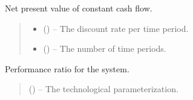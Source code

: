 \documentclass[letterpaper,10pt,english]{sphinxmanual}
\begin{document}
\begin{fulllineitems}
\label{\detokenize{technology:technology.pv_residential_large.npv}}
\pysigstartsignatures
{}
\pysigstopsignatures
\sphinxAtStartPar
Net present value of constant cash flow.
\begin{quote}\begin{description}
\begin{itemize}
\item {} 
\sphinxAtStartPar
{} () – The discount rate per time period.

\item {} 
\sphinxAtStartPar
{} () – The number of time periods.

\end{itemize}

\end{description}\end{quote}

\end{fulllineitems}


\begin{fulllineitems}
\label{\detokenize{technology:technology.pv_residential_large.performance_ratio}}
\pysigstartsignatures
{}
\pysigstopsignatures
\sphinxAtStartPar
Performance ratio for the system.
\begin{quote}\begin{description}
\sphinxAtStartPar
{} () – The technological parameterization.

\end{description}\end{quote}

\end{fulllineitems}
\end{document}
